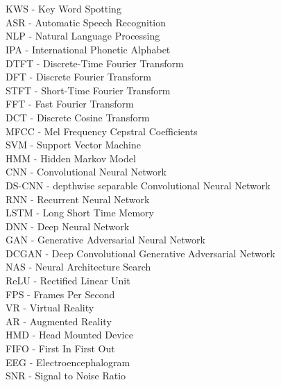 
\chapter*{}
KWS - Key Word Spotting\\
ASR - Automatic Speech Recognition\\
NLP - Natural Language Processing\\
IPA - International Phonetic Alphabet\\
%
DTFT - Discrete-Time Fourier Transform\\
DFT - Discrete Fourier Transform\\
STFT - Short-Time Fourier Transform\\
FFT - Fast Fourier Transform\\
DCT - Discrete Cosine Transform\\
MFCC - Mel Frequency Cepstral Coefficients\\
%
SVM - Support Vector Machine\\
HMM - Hidden Markov Model\\
%
CNN - Convolutional Neural Network\\
DS-CNN - depthwise separable Convolutional Neural Network\\
RNN - Recurrent Neural Network\\
LSTM - Long Short Time Memory\\
DNN - Deep Neural Network\\
GAN - Generative Adversarial Neural Network\\
DCGAN - Deep Convolutional Generative Adversarial Network\\
NAS - Neural Architecture Search\\
ReLU - Rectified Linear Unit\\
%
FPS - Frames Per Second\\
VR - Virtual Reality\\
AR - Augmented Reality\\
HMD - Head Mounted Device\\
%
FIFO - First In First Out\\
%
EEG - Electroencephalogram\\
SNR - Signal to Noise Ratio\\